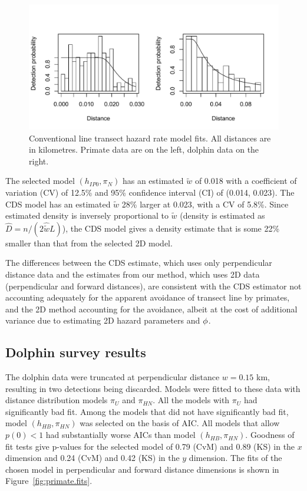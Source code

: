 \documentclass[useAMS,usenatbib,referee]{biom}
\begin{document}
\begin{figure}
\caption{Conventional line transect hazard rate model fits. All distances are in kilometres. Primate data are on the left, dolphin data on the right. \label{fig:CDSplots}}
\includegraphics[scale=1]{CDSplots.pdf}
\end{figure}

The selected model $(h_{IP0},\pi_{N})$ has an estimated $\tilde{w}$ of 0.018 with a coefficient of variation (CV) of 12.5\% and 95\% confidence interval (CI) of (0.014, 0.023). The CDS model has an estimated $\tilde{w}$ 28\% larger at 0.023, with a CV of 5.8\%. Since estimated density is inversely proportional to $\tilde{w}$ (density is estimated as $\hat{D}=n/(2\widehat{\tilde{w}}L)$), the CDS model gives a density estimate that is some 22\% smaller than that from the selected 2D model.

The differences between the CDS estimate, which uses only perpendicular distance data and the estimates from our method, which uses 2D data (perpendicular and forward distances), are consistent with the CDS estimator not accounting adequately for the apparent avoidance of transect line by primates, and the 2D method accounting for the avoidance, albeit at the cost of additional variance due to estimating 2D hazard parameters and $\boldmath{\phi}$.

\subsection{Dolphin survey results}

The dolphin data were truncated at perpendicular distance $w=0.15$ km, resulting in two detections being discarded. Models were fitted to these data with distance distribution models $\pi_{U}$ and $\pi_{HN}$. All the models with $\pi_{U}$ had significantly bad fit. Among the models that did not have significantly bad fit, model $(h_{HB},\pi_{HN})$ was selected on the basis of AIC. All models that allow $p(0)<1$ had substantially worse AICs than model $(h_{HB},\pi_{HN})$. Goodness of fit tests give p-values for the selected model of 0.79  (CvM)  and 0.89 (KS) in the $x$ dimension and 0.24 (CvM)  and 0.42 (KS) in the $y$ dimension. The fits of the chosen model in perpendicular and forward distance dimensions is shown in Figure~\ref{fig:primate.fits}.
%
%
\end{document}
